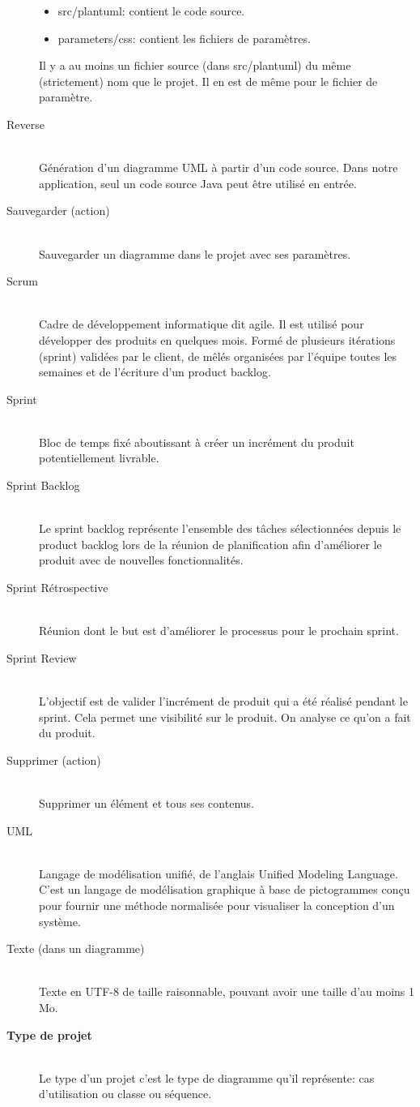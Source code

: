 \documentclass[hidelinks, 10pt,a4paper]{article}
\begin{document}
\begin{description}
\begin{itemize}
	  \item src/plantuml: contient le code source.
	  \item parameters/css: contient les fichiers de paramètres.
	\end{itemize}
	Il y a au moins un fichier source (dans src/plantuml) du même (strictement) nom que le projet. Il en est de même pour le fichier de paramètre. 
  \item[Reverse]~\\ Génération d’un diagramme UML à partir d’un code source. Dans notre application, seul un code source Java peut être utilisé en entrée.
  \item[Sauvegarder (action)]~\\ Sauvegarder un diagramme dans le projet avec ses paramètres.
  \item[Scrum]~\\ Cadre de développement informatique dit agile. Il est utilisé pour développer des produits en quelques mois. Formé de plusieurs itérations (sprint)
		  validées par le client, de mêlés organisées par l'équipe toutes les semaines et de l'écriture d'un product backlog.
  \item[Sprint]~\\ Bloc de temps fixé aboutissant à créer un incrément du produit potentiellement livrable.
  \item[Sprint Backlog]~\\ Le sprint backlog représente l’ensemble des tâches sélectionnées depuis le product backlog 
			  lors de la réunion de planification afin d’améliorer le produit avec de nouvelles fonctionnalités.
  \item[Sprint Rétrospective]~\\ Réunion dont le but est d'améliorer le processus pour le prochain sprint.
  \item[Sprint Review]~\\  L'objectif est de valider l'incrément de produit qui a été réalisé pendant le sprint. Cela permet une visibilité sur le produit.
			On analyse ce qu'on a fait du produit.
  \item[Supprimer (action)]~\\ Supprimer un élément et tous ses contenus.
  \item[UML]~\\ Langage de modélisation unifié, de l’anglais Unified Modeling Language. C’est un langage de modélisation 
    graphique à base de pictogrammes conçu pour fournir une méthode normalisée pour visualiser la conception d’un système. %
  \item[Texte (dans un diagramme)]~\\ Texte en UTF-8 de taille raisonnable, pouvant avoir une taille d’au moins 1 Mo.
   \item[\textbf{Type de projet}]~\\ Le type d'un projet c'est le type de diagramme qu'il représente: cas d'utilisation ou classe ou séquence.
\end{description}
\end{document}
